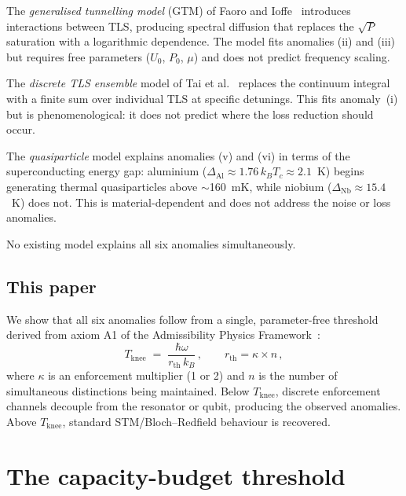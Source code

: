 \documentclass[11pt]{article}
\begin{document}
The \emph{generalised tunnelling model} (GTM) of Faoro and Ioffe~\cite{Faoro2012,Burnett2016} introduces interactions between TLS, producing spectral diffusion that replaces the $\sqrt{P}$ saturation with a logarithmic dependence.  The model fits anomalies (ii) and (iii) but requires free parameters ($U_0$, $P_0$, $\mu$) and does not predict frequency scaling.

The \emph{discrete TLS ensemble} model of Tai et al.~\cite{Tai2024} replaces the continuum integral with a finite sum over individual TLS at specific detunings.  This fits anomaly~(i) but is phenomenological: it does not predict where the loss reduction should occur.

The \emph{quasiparticle} model explains anomalies (v) and (vi) in terms of the superconducting energy gap: aluminium ($\Delta_{\mathrm{Al}} \approx 1.76\,k_B T_c \approx 2.1$~K) begins generating thermal quasiparticles above $\sim$160~mK, while niobium ($\Delta_{\mathrm{Nb}} \approx 15.4$~K) does not.  This is material-dependent and does not address the noise or loss anomalies.

No existing model explains all six anomalies simultaneously.

\subsection{This paper}

We show that all six anomalies follow from a single, parameter-free threshold derived from axiom A1 of the Admissibility Physics Framework~\cite{Brooke_P1}:
\begin{equation}\label{eq:threshold}
T_{\mathrm{knee}} \;=\; \frac{\hbar\omega}{r_{\mathrm{th}} \, k_B}\,,\qquad r_{\mathrm{th}} = \kappa \times n\,,
\end{equation}
where $\kappa$ is an enforcement multiplier (1 or 2) and $n$ is the number of simultaneous distinctions being maintained.  Below $T_{\mathrm{knee}}$, discrete enforcement channels decouple from the resonator or qubit, producing the observed anomalies.  Above $T_{\mathrm{knee}}$, standard STM/Bloch--Redfield behaviour is recovered.


\section{The capacity-budget threshold}
\end{document}
